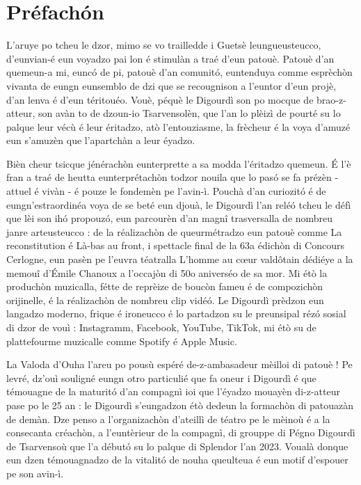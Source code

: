 \chapter*{Préfach\'on} 
L’aruye po tcheu le dzor, mimo se vo trailledde i Guetsè leungueusteucco, d’eunvian-é eun voyadzo  pai lon é stimulàn a traé d’eun patouè. Patouè d’an quemeun-a mi, euncó de pi, patouè d’an comunitó, euntenduya comme esprèchòn vivanta de eungn eunsemblo de dzi que se recougnison a l’euntor d’eun projè, d’an lenva é d’eun téritouéo. Vouè, péquè le Digourdì son po mocque de brao-z-atteur, son avàn to de dzoun-io Tsarvensolèn, que l’an lo plèizì de pourté su lo palque leur vécù é leur éritadzo, atò l’entouziasme, la frècheur é la voya d’amuzé eun s’amuzèn que l’apartchàn a leur éyadzo.
 
Bièn cheur tsicque jénérachòn eunterprette a sa modda l’éritadzo quemeun. É l’è fran a traé de heutta eunterprétachòn todzor nouila que lo pasó se fa prézèn - attuel é vivàn - é pouze le fondemèn pe l’avin-ì.  Pouchà d’an curiozitó é de eungn’estraordinéa voya de se beté eun djouà, le Digourdì l’an reléó tcheu le défì que lèi son ihó propouzó, eun parcourèn d’an magnî trasversalla de nombreu janre arteusteucco : de la réalizachòn de queurmétradzo eun patouè comme La reconstitution é Là-bas au front, i spettacle final de la 63a édichòn di Concours Cerlogne, eun pasèn pe l’euvra téatralla L’homme au cœur valdôtain dédiéye a la memouî d’Émile Chanoux a l’occajòn di 50o aniverséo de sa mor. Mi étò la produchòn muzicalla, fétte de reprèize de boucòn fameu é de compozichòn orijinelle, é la réalizachòn de nombreu clip vidéó. Le Digourdì prèdzon eun langadzo moderno, frique é ironeucco é lo partadzon su le preunsipal rézó sosial di dzor de vouì : Instagramm, Facebook, YouTube, TikTok, mi étò su de plattefourme muzicalle comme Spotify é Apple Music. 

La Valoda d’Ouha l’areu po pousù espéré de-z-ambasadeur mèilloi di patouè ! 
Pe levré, dz’ouì souligné eungn otro particulié que fa oneur i Digourdì é que témouagne de la maturitó d’an compagnì ioi que l’éyadzo mouayèn di-z-atteur pase po le 25 an : le Digourdì s’eungadzon étò dedeun la formachòn di patouazàn de demàn. Dze penso a l’organizachòn d’ateillì de téatro pe le mèinoù é a la consecanta créachòn, a l’euntèrieur de la compagnì, di grouppe di Pégno Digourdì de Tsarvensoù que l’a débutó su lo palque di Splendor l’an 2023.
Voualà donque eun dzen témouagnadzo de la vitalitó de nouha queulteua é eun motif d’espouer pe son avin-ì.

